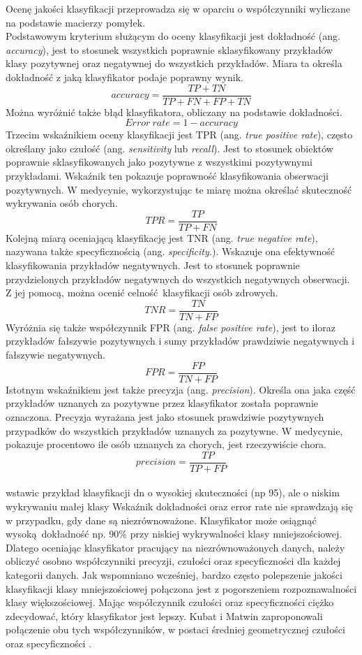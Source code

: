 Ocenę jakości klasyfikacji przeprowadza się w oparciu o współczynniki wyliczane na podstawie macierzy pomyłek.\\
Podstawowym kryterium służącym do oceny klasyfikacji jest dokładność (ang. \textit{accuracy}), jest to stosunek wszystkich poprawnie sklasyfikowany przykładów klasy pozytywnej oraz negatywnej do wszystkich przykładów. Miara ta określa dokładność z jaką klasyfikator podaje poprawny wynik.
\[accuracy = \frac{TP + TN}{TP + FN + FP + TN}\]
Można wyróżnić także błąd klasyfikatora, obliczany na podstawie dokładności.
\[Error\ rate = 1 - accuracy\label{error_rate}\]
Trzecim wskaźnikiem oceny klasyfikacji jest TPR (ang. \textit{true positive rate}), często określany jako czułość (ang. \textit{sensitivity} lub \textit{recall}). Jest to stosunek obiektów poprawnie sklasyfikowanych jako pozytywne z wszystkimi pozytywnymi przykładami. Wskaźnik ten pokazuje poprawność klasyfikowania obserwacji pozytywnych. W medycynie, wykorzystując te miarę można określać skuteczność wykrywania osób chorych.
\[TPR = \frac{TP}{TP + FN}\]
Kolejną miarą oceniającą klasyfikację jest TNR (ang. \textit{true negative rate}), nazywana także specyficznością (ang. \textit{specificity.}). Wskazuje ona efektywność klasyfikowania przykładów negatywnych. Jest to stosunek poprawnie przydzielonych przykładów negatywnych do wszystkich negatywnych obserwacji. Z jej pomocą, można ocenić celność klasyfikacji osób zdrowych.
\[TNR = \frac{TN}{TN + FP}\]
Wyróżnia się także współczynnik FPR (ang. \textit{false positive rate}), jest to iloraz przykładów fałszywie pozytywnych i sumy przykładów prawdziwie negatywnych i fałszywie negatywnych.
\[FPR = \frac{FP}{TN + FP}\]
Istotnym wskaźnikiem jest także precyzja (ang. \textit{precision}). Określa ona jaka część przykładów uznanych za pozytywne przez klasyfikator została poprawnie oznaczona. Precyzja wyrażana jest jako stosunek prawdziwie pozytywnych przypadków do wszystkich przykładów uznanych za pozytywne. W medycynie, pokazuje procentowo ile osób uznanych za chorych, jest rzeczywiście chora.
\[precision = \frac{TP}{TP + FP}\]\\
 wstawic przykład klasyfikacji dn o wysokiej skuteczności (np 95), ale o niskim wykrywaniu małej klasy
Wskaźnik dokładności oraz error rate nie sprawdzają się w przypadku, gdy dane są niezrównoważone. Klasyfikator może osiągnąć wysoką dokładność np. 90\% przy niskiej wykrywalności klasy mniejszościowej.
Dlatego oceniając klasyfikator pracujący na niezrównoważonych danych, należy obliczyć osobno współczynniki precyzji, czułości oraz specyficzności dla każdej kategorii danych. Jak wspomniano wcześniej, bardzo często polepszenie jakości klasyfikacji klasy mniejszościowej połączona jest z pogorszeniem rozpoznawalności klasy większościowej. Mając współczynnik czułości oraz specyficzności ciężko zdecydować, który klasyfikator jest lepszy. Kubat i Matwin zaproponowali połączenie obu tych współczynników, w postaci średniej geometrycznej czułości oraz specyficzności \cite{KubatMatwin}. 
